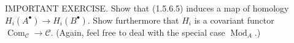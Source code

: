 IMPORTANT EXERCISE. Show that (1.5.6.5) induces a map of homology $H_i(A^\bullet)\to H_i(B^\bullet)$. Show furthermore that $H_i$ is a covariant functor $\operatorname{Com}_{\mathcal{C}}\to\mathcal{C}$. (Again, feel free to deal with the special case $\operatorname{Mod}_A$.)
